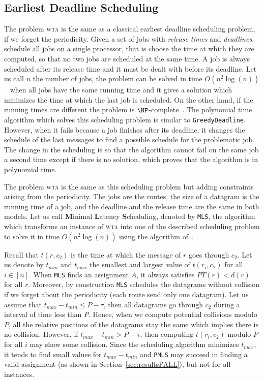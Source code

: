 \documentclass[a4paper,10pt]{article}
\newcommand\greedydeadline{\texttt{GreedyDeadline}\xspace}
\newcommand\MLS{\texttt{MLS}\xspace}
\newcommand\PMLS{\texttt{PMLS}\xspace}
\newcommand\wta{\textsc{wta}\xspace}
\begin{document}
     \subsection{Earliest Deadline Scheduling}\label{sec:wtaheuristic}
     
     
     The problem \wta is the same as a classical earliest deadline scheduling problem, if we forget the periodicity. Given a set of jobs with \emph{release times} and \emph{deadlines}, schedule all jobs on a single processor, that is choose the time at which they are computed, so that no two jobs are scheduled at the same time. A job is always scheduled after its release time and it must be dealt with before its deadline. Let us call $n$ the number of jobs, the problem can be solved in time $O(n^2\log(n))$~\cite{simons1978fast} when all jobs have the same running time and it gives a solution which minimizes the time at which the last job is scheduled. On the other hand, if the running times are different the problem is $\NP$-complete~\cite{lenstra1977complexity}. 
     The polynomial time algorithm which solves this scheduling problem is similar to \greedydeadline. However, when it fails because a job finishes after its deadline, it changes the schedule of the last messages to find a possible schedule for the problematic job. The change in the scheduling is so that the algorithm cannot fail on the same job a second time except if there is no solution, which proves that the algorithm is in polynomial time.
     
     The problem \wta is the same as this scheduling problem but adding constraints arising from
     the periodicity. The jobs are the routes, the size of a datagram is the running time of a job, 
     and the deadline and the release time are the same in both models.
	 Let us call \textbf{M}inimal \textbf{L}atency \textbf{S}cheduling, denoted by \MLS, the algorithm which transforms an instance of \wta into one of the described scheduling problem to solve it in time $O(n^2\log(n))$ using the algorithm of~\cite{simons1978fast}.
     

    
     Recall that $t(r,c_2)$ is the time at which the message of $r$ goes through $c_2$. Let us denote by $t_{min}$ and $t_{max}$ the smallest and largest value of $t(r_i,c_2)$ for all $i \in[n]$. When \MLS finds an assignment $A$, it always satisfies $PT(r) < d(r)$ for all $r$. Moreover, by construction \MLS schedules the datagrams without collision if we forget about the periodicity (each route send only one datagram). Let us assume that $t_{max}- t_{min} \leq P -\tau $, then all datagrams go through $c_2$ during a interval of time less than $P$. Hence, when we compute potential collisions modulo $P$, all the relative positions of the datagrams stay the same which implies there is no collision. However, if $t_{max}- t_{min} > P -\tau $, then computing $t(r_i,c_2)$ modulo $P$ for all $i$ may show some collision. Since the scheduling algorithm minimizes $t_{max}$, it tends to find  small values for $t_{max} - t_{min}$ and \PMLS may succeed in finding a valid assignment (as shown in Section~\ref{sec:resultsPALL}), but not for all instances. 
     
\end{document}
